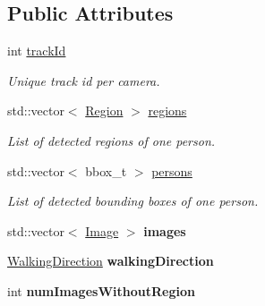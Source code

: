 \subsection*{Public Attributes}
\begin{DoxyCompactItemize}
\item 
\mbox{\label{structdto_1_1_track_a320df93fe354da317d91990a238372eb}} 
int \mbox{\hyperlink{structdto_1_1_track_a320df93fe354da317d91990a238372eb}{track\+Id}}
\begin{DoxyCompactList}\small\item\em Unique track id per camera. \end{DoxyCompactList}\item 
\mbox{\label{structdto_1_1_track_aa1c033def8ecf0b4fb81f8a45c78ea90}} 
std\+::vector$<$ \mbox{\hyperlink{structdto_1_1_region}{Region}} $>$ \mbox{\hyperlink{structdto_1_1_track_aa1c033def8ecf0b4fb81f8a45c78ea90}{regions}}
\begin{DoxyCompactList}\small\item\em List of detected regions of one person. \end{DoxyCompactList}\item 
\mbox{\label{structdto_1_1_track_a60813ab64018da3e4f2de3d95d200a73}} 
std\+::vector$<$ bbox\+\_\+t $>$ \mbox{\hyperlink{structdto_1_1_track_a60813ab64018da3e4f2de3d95d200a73}{persons}}
\begin{DoxyCompactList}\small\item\em List of detected bounding boxes of one person. \end{DoxyCompactList}\item 
\mbox{\label{structdto_1_1_track_ae32d3ea9632fb2a4cd85536ebb311cab}} 
std\+::vector$<$ \mbox{\hyperlink{structdto_1_1_image}{Image}} $>$ {\bfseries images}
\item 
\mbox{\label{structdto_1_1_track_a0979e73bf1445a0c38c59b6a2af683dc}} 
\mbox{\hyperlink{structdto_1_1_track_a2d90d1ffc1df80623114c42f874aad04}{Walking\+Direction}} {\bfseries walking\+Direction}
\item 
\mbox{\label{structdto_1_1_track_a68968ac53f7724b60fbb620f296ddae7}} 
int {\bfseries num\+Images\+Without\+Region}

\end{DoxyCompactItemize}
